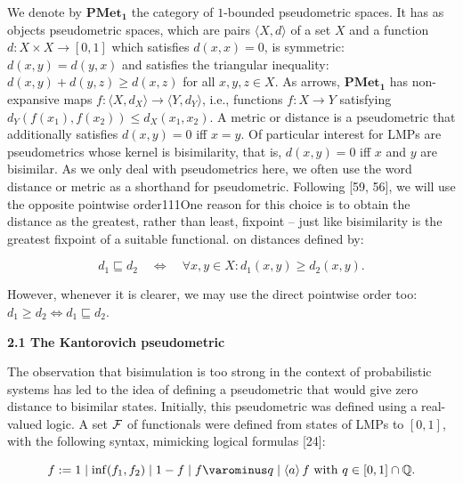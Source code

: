 We denote by $\mathbf{PMet_{1}}$ the category of $1$-bounded pseudometric spaces. It has as objects pseudometric spaces, which are pairs $\langle X,d\rangle$ of a set $X$ and a function $d\colon X\times X\to[0,1]$ which satisfies $d(x,x)=0$, is symmetric: $d(x,y)=d(y,x)$ and satisfies the triangular inequality: $d(x,y)+d(y,z)\geq d(x,z)$ for all $x,y,z\in X$. As arrows, $\mathbf{PMet_{1}}$ has non-expansive maps $f\colon\langle X,d_{X}\rangle\to\langle Y,d_{Y}\rangle$, i.e., functions $f\colon X\to Y$ satisfying $d_{Y}(f(x_{1}),f(x_{2}))\leq d_{X}(x_{1},x_{2})$. A metric or distance is a pseudometric that additionally satisfies $d(x,y)=0$ iff $x=y$. Of particular interest for LMPs are pseudometrics whose kernel is bisimilarity, that is, $d(x,y)=0$ iff $x$ and $y$ are bisimilar. As we only deal with pseudometrics here, we often use the word distance or metric as a shorthand for pseudometric. Following [59, 56], we will use the opposite pointwise order111One reason for this choice is to obtain the distance as the greatest, rather than least, fixpoint – just like bisimilarity is the greatest fixpoint of a suitable functional. on distances defined by:\par
  
\par  \quad  \[d_{1}\sqsubseteq d_{2}\quad\Longleftrightarrow\quad\forall x,y\in X:d_{1}(x,y)\geq d_{2}(x,y).\]\quad  \quad  
  
However, whenever it is clearer, we may use the direct pointwise order too: $d_{1}\geq d_{2}\Leftrightarrow d_{1}\sqsubseteq d_{2}$.\par
 
 
 
\par\medskip\noindent\textbf{2.1 The Kantorovich pseudometric}\par
 
 
The observation that bisimulation is too strong in the context of probabilistic systems has led to the idea of defining a pseudometric that would give zero distance to bisimilar states. Initially, this pseudometric was defined using a real-valued logic. A set $\cal F$ of functionals were defined from states of LMPs to $[0,1]$, with the following syntax, mimicking logical formulas [24]:\par
  
\par  \quad  \[f:=1\mid\inf(f_{1},f_{2})\mid 1-f\mid f\varominus q\mid\langle a\rangle\,f\mbox{ with }q\in[0,1]\cap\mathbb{Q}.\]\quad  \quad  
  
